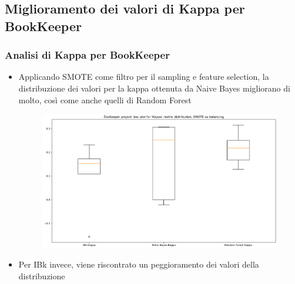 \documentclass[10pt]{beamer}
\begin{document}
\begin{frame}
\subsection{Miglioramento dei valori di Kappa per BookKeeper}
\frametitle{Analisi di Kappa per BookKeeper}
\begin{itemize}
\item Applicando SMOTE come filtro per il sampling e feature selection, la distribuzione dei valori per la kappa ottenuta da Naive Bayes migliorano di molto, così come anche quelli di Random Forest
\begin{figure}
\includegraphics[scale=0.25]{images/k_bett_bk}
\end{figure}
\item Per IBk invece, viene riscontrato un peggioramento dei valori della distribuzione
\end{itemize}
\end{frame}
\end{document}

